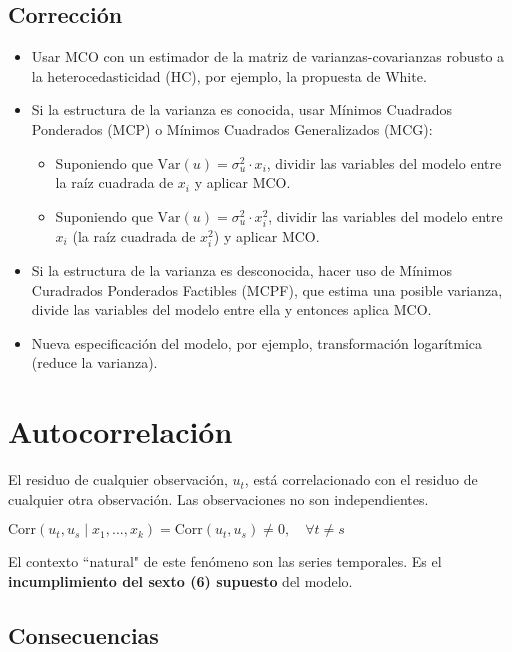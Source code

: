 \documentclass[10pt, a4paper, landscape]{extarticle}
\newcommand{\Var}{\mathrm{Var}}
\newcommand{\Corr}{\mathrm{Corr}}
\begin{document}
\begin{multicols}{3}
\subsection*{Corrección}

\begin{itemize}[leftmargin=*]
	\item Usar MCO con un estimador de la matriz de varianzas-covarianzas robusto a la heterocedasticidad (HC), por ejemplo, la propuesta de White.
	\item Si la estructura de la varianza es conocida, usar Mínimos Cuadrados Ponderados (MCP) o Mínimos Cuadrados Generalizados (MCG):
	\begin{itemize}[leftmargin=*]
		\item Suponiendo que $\Var(u) = \sigma^2_u \cdot x_i$, dividir las variables del modelo entre la raíz cuadrada de $x_i$ y aplicar MCO.
		\item Suponiendo que $\Var(u) = \sigma^2_u \cdot x_i^2$, dividir las variables del modelo entre $x_i$ (la raíz cuadrada de $x_i^2$) y aplicar MCO.
	\end{itemize}
	\item Si la estructura de la varianza es desconocida, hacer uso de Mínimos Curadrados Ponderados Factibles (MCPF), que estima una posible varianza, divide las variables del modelo entre ella y entonces aplica MCO.
	\item Nueva especificación del modelo, por ejemplo, transformación logarítmica (reduce la varianza).
\end{itemize}

\columnbreak

\section*{Autocorrelación}

El residuo de cualquier observación, $u_t$, está correlacionado con el residuo de cualquier otra observación. Las observaciones no son independientes.

\begin{center}
	$\Corr(u_t, u_s \mid x_1, \ldots, x_k) = \Corr(u_t, u_s) \neq 0, \quad \forall t \neq s$
\end{center}

El contexto ``natural" de este fenómeno son las series temporales. Es el \textbf{incumplimiento del sexto (6) supuesto} del modelo.

\subsection*{Consecuencias}


\end{multicols}
\end{document}
